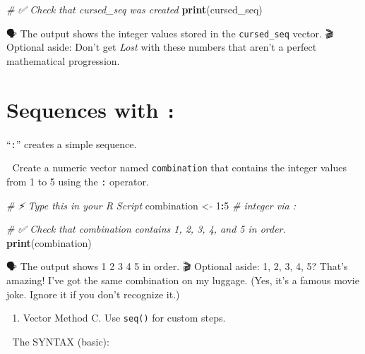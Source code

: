 \documentclass[
  12pt,
]{scrreprt}
\newenvironment{Shaded}{\begin{snugshade}}{\end{snugshade}}
\newcommand{\CommentTok}[1]{\textcolor[rgb]{0.56,0.35,0.01}{\textit{#1}}}
\newcommand{\DecValTok}[1]{\textcolor[rgb]{0.00,0.00,0.81}{#1}}
\newcommand{\FunctionTok}[1]{\textcolor[rgb]{0.13,0.29,0.53}{\textbf{#1}}}
\newcommand{\NormalTok}[1]{#1}
\newcommand{\OtherTok}[1]{\textcolor[rgb]{0.56,0.35,0.01}{#1}}
\newcommand{\SpecialCharTok}[1]{\textcolor[rgb]{0.81,0.36,0.00}{\textbf{#1}}}
\providecommand{\tightlist}{%
  \setlength{\itemsep}{0pt}\setlength{\parskip}{0pt}}
\begin{document}
\begin{Shaded}
\begin{Highlighting}[]
\CommentTok{\# ✅ Check that cursed\_seq was  created}
\FunctionTok{print}\NormalTok{(cursed\_seq)}
\end{Highlighting}
\end{Shaded}

🗣 The output shows the integer values stored in the \texttt{cursed\_seq}
vector. 🎬 Optional aside: Don't get \emph{Lost} with these numbers that
aren't a perfect mathematical progression.

\section{\texorpdfstring{Sequences with
\texttt{:}}{Sequences with :}}\label{sequences-with}

``\texttt{:}'' creates a simple sequence.

🎯 Create a numeric vector named \texttt{combination} that contains the
integer values from 1 to 5 using the \texttt{:} operator.

\begin{Shaded}
\begin{Highlighting}[]
\CommentTok{\# ⚡ Type this in your R Script}
\NormalTok{combination }\OtherTok{\textless{}{-}} \DecValTok{1}\SpecialCharTok{:}\DecValTok{5}                             \CommentTok{\# integer via :}
\end{Highlighting}
\end{Shaded}

\begin{Shaded}
\begin{Highlighting}[]
\CommentTok{\# ✅ Check that combination contains 1, 2, 3, 4, and 5 in order.}
\FunctionTok{print}\NormalTok{(combination)}
\end{Highlighting}
\end{Shaded}

🗣 The output shows 1 2 3 4 5 in order. 🎬 Optional aside: 1, 2, 3, 4, 5?
That's amazing! I've got the same combination on my luggage. (Yes, it's
a famous movie joke. Ignore it if you don't recognize it.)

\begin{enumerate}
\def\labelenumi{\arabic{enumi}.}
\setcounter{enumi}{2}
\tightlist
\item
  Vector Method C. Use \texttt{seq()} for custom steps.
\end{enumerate}

📜 The SYNTAX (basic):
\end{document}
